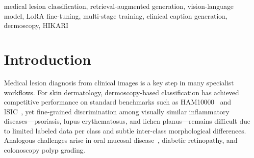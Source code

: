 \documentclass[conference,a4paper]{IEEEtran}
\begin{document}
\begin{abstract}
We present HIKARI (\textbf{H}ealthcare-oriented \textbf{I}ntelligent
\textbf{K}nowledge-\textbf{A}ugmented \textbf{R}etrieval and
\textbf{I}nference system), a prototype multi-stage Vision-Language Model
(VLM) pipeline for medical lesion diagnosis and clinical caption generation.
Validated on skin dermatology as a representative domain, the architecture
is designed to generalize across oral mucosal disease, fundus lesions, and
other medical imaging modalities.
Retrieval-Augmented Generation (RAG) provides visual few-shot context at
inference time, yet a train-inference distribution gap persists when the
model is fine-tuned on single images.
We propose \textbf{RAG-in-Training}, which incorporates retrieved reference
images into every training sample, enabling the VLM to exploit reference
context at inference.
Built on a three-stage cascaded Low-Rank Adaptation (LoRA) fine-tuning
pipeline using Qwen3-VL-8B-Thinking on the SkinCAP dataset (10 disease
classes, 99 validation samples), HIKARI achieves 85.86\% classification accuracy, surpassing the
single-image fine-tuned (FT) baseline by 11.86~pp (74.00\%) and
inference-only RAG by 6.06~pp (79.80\%).
We further show that merging adapter weights before switching tasks
(\textbf{Merged-Init}) yields a 3$\times$ BLEU-4 gain for caption
generation (9.82 $\rightarrow$ 29.33).
\end{abstract}

\begin{IEEEkeywords}
medical lesion classification, retrieval-augmented generation,
vision-language model, LoRA fine-tuning, multi-stage training,
clinical caption generation, dermoscopy, HIKARI
\end{IEEEkeywords}

\section{Introduction}

Medical lesion diagnosis from clinical images is a key step in many
specialist workflows.  For skin dermatology, dermoscopy-based
classification has achieved competitive performance on standard benchmarks
such as HAM10000~\cite{tschandl2018} and ISIC~\cite{codella2019}, yet
fine-grained discrimination among visually similar inflammatory
diseases---psoriasis, lupus erythematosus, and lichen planus---remains
difficult due to limited labeled data per class and subtle inter-class
morphological differences.  Analogous challenges arise in oral mucosal
disease~\cite{zhang2025oralgpt}, diabetic retinopathy, and
colonoscopy polyp grading.
\end{document}
